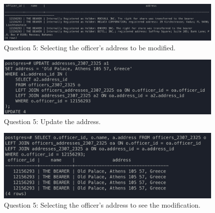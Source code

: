 \documentclass{article}
\begin{document}
\begin{figure}[h]
    \centering
    \includegraphics[width=0.9\linewidth]{Q5b.png}
    \captionsetup{labelformat=empty}
    \caption{Question 5: Selecting the officer's address to be modified.}
\end{figure}

\begin{figure}[h]
    \centering
    \includegraphics[width=0.9\linewidth]{Q5c.png}
    \captionsetup{labelformat=empty}
    \caption{Question 5: Update the address.}
\end{figure}

\begin{figure}[h]
    \centering
    \includegraphics[width=0.9\linewidth]{Q5d.png}
    \captionsetup{labelformat=empty}
    \caption{Question 5: Selecting the officer's address to see the modification.}
\end{figure}
\end{document}
